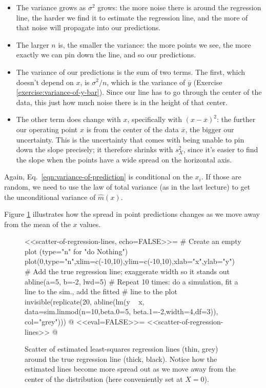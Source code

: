 \documentclass{article}
\begin{document}
\begin{itemize}
\item The variance grows as $\sigma^2$ grows: the more noise there is around
  the regression line, the harder we find it to estimate the regression line,
  and the more of that noise will propagate into our predictions.
\item The larger $n$ is, the smaller the variance: the more points we see, the
  more exactly we can pin down the line, and so our predictions.
\item The variance of our predictions is the sum of two terms.  The first,
  which doesn't depend on $x$, is $\sigma^2/n$, which is the variance of
  $\overline{y}$ (Exercise \ref{exercise:variance-of-y-bar}).  Since our line
  has to go through the center of the data, this just how much noise there is
  in the height of that center.
\item The other term does change with $x$, specifically with
  $(x-\overline{x})^2$: the further our operating point $x$ is from the center
  of the data $\overline{x}$, the bigger our uncertainty.  This is the
  uncertainty that comes with being unable to pin down the slope precisely; it
  therefore shrinks with $s^2_X$, since it's easier to find the slope when the
  points have a wide spread on the horizontal axis.
\end{itemize}

Again, Eq.\ \ref{eqn:variance-of-prediction} is conditional on the $x_i$.  If
those are random, we need to use the law of total variance (as in the last
lecture) to get the unconditional variance of $\hat{m}(x)$.

Figure \ref{fig:scatter-of-regression-lines} illustrates how the spread in
point predictions changes as we move away from the mean of the $x$ values.

\begin{figure}
<<scatter-of-regression-lines, echo=FALSE>>=
# Create an empty plot (type="n" for "do Nothing")
plot(0,type="n",xlim=c(-10,10),ylim=c(-10,10),xlab="x",ylab="y")
# Add the true regression line; exaggerate width so it stands out
abline(a=5, b=-2, lwd=5)
# Repeat 10 times: do a simulation, fit a line to the sim., add the fitted
# line to the plot
invisible(replicate(20, abline(lm(y ~ x, data=sim.linmod(n=10,beta.0=5,
                                             beta.1=-2,width=4,df=3)),
                               col="grey")))
@
<<eval=FALSE>>=
<<scatter-of-regression-lines>>
@
\caption{Scatter of estimated least-squares regression lines (thin, grey)
  around the true regression line (thick, black).  Notice how the estimated
  lines become more spread out as we move away from the center of the
  distribution (here conveniently set at $X=0$).}
\label{fig:scatter-of-regression-lines}
\end{figure}
\end{document}
